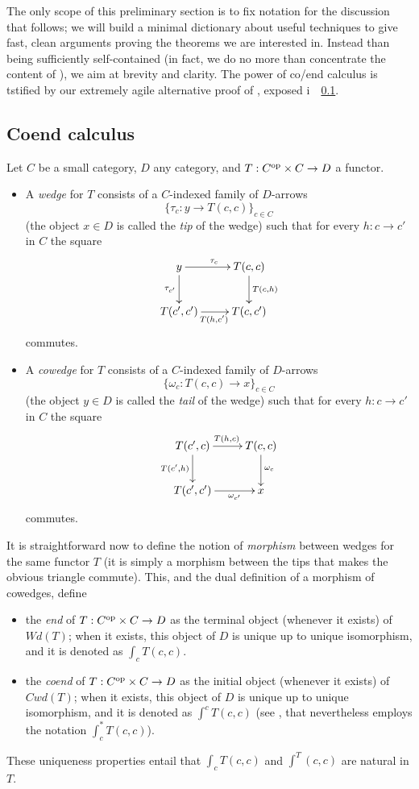 The only scope of this preliminary section is to fix notation for the
discussion that follows; we will build a minimal dictionary about useful
techniques to give fast, clean arguments proving the theorems we are interested
in. Instead than being sufficiently self-contained (in fact, we do no more than
concentrate the content of \cite[§1,2]{cofriend}), we aim at brevity and
clarity. The power of co/end calculus is tstified by our extremely agile
alternative proof of \cite[???]{adamek2002classification}, exposed i~~\ref{}.
\subsection{Coend calculus}
\begin{definition}[co/wedges]
Let $C$ be a small category, $D$ any category, and $T : C^{\text{op}}\times C \to D$ a functor.
\begin{itemize}
\item A \emph{wedge} for $T$ consists of a $C$-indexed family of $D$-arrows
\[
\{\tau_c : y\to T(c,c)\}_{c\in C}
\]
(the object $x\in D$ is called the \emph{tip} of the wedge) such that for every
$h : c\to c'$ in $C$ the square
\[\xymatrix{y \ar[r]^{\tau_c}\ar[d]_{\tau_{c'}}& T(c,c)
\ar[d]^{T(c,h)}\\T(c',c') \ar[r]_{T(h,c')}& T(c,c')}\] commutes.
\item A \emph{cowedge} for $T$ consists of a $C$-indexed family of $D$-arrows
\[
\{\omega_c : T(c,c)\to x\}_{c\in C}
\]
(the object $y\in D$ is called the \emph{tail} of the wedge) such that for every
$h : c\to c'$ in $C$ the square
\[\xymatrix{T(c',c) \ar[r]^{T(h,c)}\ar[d]_{T(c',h)}& T(c,c)\ar[d]^{\omega_c}\\
T(c',c')\ar[r]_-{\omega_{c'}} & x}\]
commutes.
\end{itemize}
\end{definition}
\begin{definition}
It is straightforward now to define the notion of \emph{morphism} between wedges
for the same functor $T$ (it is simply a morphism between the tips that makes
the obvious triangle commute). This, and the dual definition of a morphism of
cowedges, define
\begin{itemize}
\item the \emph{end} of $T :C^{\text{op}}\times C \to D$ as the terminal object
(whenever it exists) of $Wd(T)$; when it exists, this object of $D$ is unique up
to unique isomorphism, and it is denoted as $\int_c T(c,c)$.
\item the \emph{coend} of $T :C^{\text{op}}\times C \to D$ as the initial object
(whenever it exists) of $Cwd(T)$; when it exists, this object of $D$ is unique
up to unique isomorphism, and it is denoted as $\int^c T(c,c)$ (see
\cite{yoneda}, that nevertheless employs the notation $\int_c^* T(c,c)$).
\end{itemize}
These uniqueness properties entail that $\int_c T(c,c)$ and $\int^T(c,c)$ are natural in $T$.
\end{definition}
